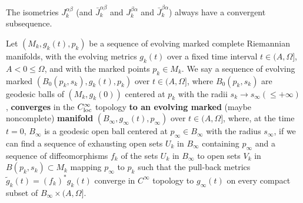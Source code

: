 \begin{proposition}
  \label{prop:cz-transition-isometry-subsequence-convergence}
The isometries $J_k^{\alpha\beta}$
(and $\bar J_k^{\alpha\beta}$ and $J_k^{\beta\alpha}$ and $\bar
J_k^{\beta\alpha}$) always have a convergent subsequence. \vskip
0.2cm
\end{proposition}
\begin{definition}
  \label{def:cz-pointed-convergence-of-evolving-manifolds}
Let $(M_k,g_k(t),p_k)$ be a sequence of evolving marked complete
Riemannian manifolds, with the evolving metrics $g_k(t)$ over a
fixed time interval $t\in(A,\Omega]$, $A < 0 \leq \Omega$, and
with the marked points $p_k\in M_k$. We say a sequence of evolving
marked $(B_0(p_k,s_k),g_k(t),p_k)$ over $t \in (A,\Omega]$, where
$B_0(p_k,s_k)$ are geodesic balls of $(M_k,g_k(0))$ centered at
$p_k$ with the radii $s_k \rightarrow s_{\infty}(\leq +\infty)$,
{\bf converges} in the $C_{\rm loc}^{\infty}$ topology {\bf to an
evolving marked} (maybe noncomplete) {\bf
manifold}
$(B_{\infty},g_{\infty}(t),p_{\infty})$ over $t\in(A,\Omega]$,
where, at the time $t=0$, $B_{\infty}$ is a geodesic open ball
centered at $p_{\infty}\in B_{\infty}$ with the radius
$s_{\infty}$, if we can find a sequence of exhausting open sets
$U_k$ in $B_{\infty}$ containing $p_{\infty}$ and a sequence of
diffeomorphisms $f_k$ of the sets $U_k$ in $B_{\infty}$ to open
sets $V_k$ in $B(p_k,s_k) \subset M_k$ mapping $p_{\infty}$ to
$p_k$ such that the pull-back metrics
$\tilde{g}_k(t)=(f_k)^*g_k(t)$ converge in $C^\infty$ topology to
$g_{\infty}(t)$ on every compact subset of
$B_{\infty}\times(A,\Omega]$.
\end{definition}
